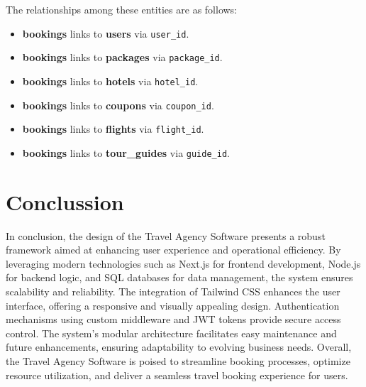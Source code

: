 \documentclass{scrreprt}
\begin{document}
The relationships among these entities are as follows:
\begin{itemize}
    \item \textbf{bookings} links to \textbf{users} via \texttt{user\_id}.
    \item \textbf{bookings} links to \textbf{packages} via \texttt{package\_id}.
    \item \textbf{bookings} links to \textbf{hotels} via \texttt{hotel\_id}.
    \item \textbf{bookings} links to \textbf{coupons} via \texttt{coupon\_id}.
    \item \textbf{bookings} links to \textbf{flights} via \texttt{flight\_id}.
    \item \textbf{bookings} links to \textbf{tour\_guides} via \texttt{guide\_id}.
\end{itemize}

\chapter{Conclussion}

In conclusion, the design of the Travel Agency Software presents a robust framework aimed at enhancing user experience and operational efficiency. By leveraging modern technologies such as Next.js for frontend development, Node.js for backend logic, and SQL databases for data management, the system ensures scalability and reliability. The integration of Tailwind CSS enhances the user interface, offering a responsive and visually appealing design. Authentication mechanisms using custom middleware and JWT tokens provide secure access control. The system's modular architecture facilitates easy maintenance and future enhancements, ensuring adaptability to evolving business needs. Overall, the Travel Agency Software is poised to streamline booking processes, optimize resource utilization, and deliver a seamless travel booking experience for users.
\end{document}
